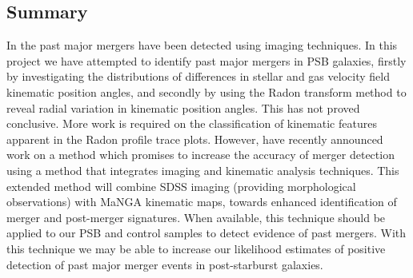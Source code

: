 \subsection{Summary}
\label{summary}
In the past major mergers have been detected using imaging techniques. In this project we have attempted to identify past major mergers in PSB galaxies, firstly by investigating the distributions of differences in stellar and gas velocity field kinematic position angles, and secondly by using the Radon transform method to reveal radial variation in kinematic position angles. This has not proved conclusive. More work is required on the classification of kinematic features apparent in the Radon profile trace plots. However, \cite{2019DDA....5020304N} have recently announced work on a method which promises to increase the accuracy of merger detection using a method that integrates imaging and kinematic analysis techniques. This extended method will combine SDSS imaging (providing morphological observations) with MaNGA  kinematic maps, towards enhanced identification of merger and post-merger signatures. When available, this technique should be applied to our PSB and control samples to detect evidence of past mergers. With this technique we may be able to increase our likelihood estimates of positive detection of past major merger events in post-starburst galaxies.

